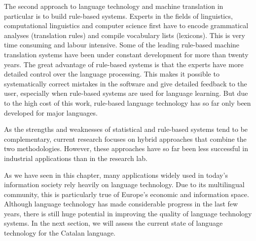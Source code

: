 \begin{multicols}{2}
    The second approach to language technology and machine translation in particular is to build rule-based systems. Experts in the fields of linguistics, computational linguistics and computer science first have to encode grammatical analyses (translation rules) and compile vocabulary lists (lexicons). This is very time consuming and labour intensive. Some of the leading rule-based machine translation systems have been under constant development for more than twenty years. The great advantage of rule-based systems is that the experts have more detailed control over the language processing. This makes it possible to systematically correct mistakes in the software and give detailed feedback to the user, especially when rule-based systems are used for language learning. But due to the high cost of this work, rule-based language technology has so far only been developed for major languages. 
    

    As the strengths and weaknesses of statistical and rule-based systems tend to be complementary, current research focuses on hybrid approaches that combine the two methodologies. However, these approaches have so far been less successful in industrial applications than in the research lab. 

    As we have seen in this chapter, many applications widely used in today’s information society rely heavily on language technology. Due to its multilingual community, this is particularly true of Europe’s economic and information space. Although language technology has made considerable progress in the last few years, there is still huge potential in improving the quality of language technology systems. In the next section, we will assess the current state of language technology for the Catalan language.
\end{multicols}

\clearpage


